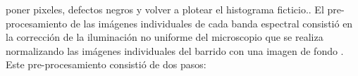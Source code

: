 	\begin{figure}[H]
		\begin{floatrow}
		\end{floatrow}
	\end{figure}
poner pixeles, defectos negros y volver a plotear el histograma ficticio..
El pre-procesamiento de las imágenes individuales de cada banda espectral consistió en la corrección de la iluminación no uniforme del microscopio que se realiza normalizando las imágenes individuales del barrido con una imagen de fondo \cite{Nordenfelt}. Este pre-procesamiento consistió de dos pasos:
